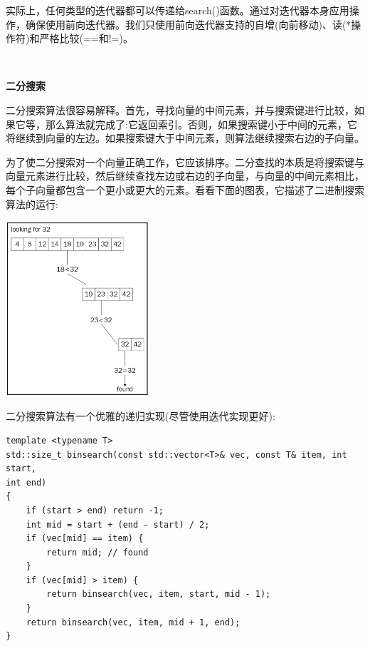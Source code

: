 实际上，任何类型的迭代器都可以传递给search()函数。通过对迭代器本身应用操作，确保使用前向迭代器。我们只使用前向迭代器支持的自增(向前移动)、读(*操作符)和严格比较(==和!=)。 \par

\noindent\textbf{}\ \par
\textbf{二分搜索} \ \par
二分搜索算法很容易解释。首先，寻找向量的中间元素，并与搜索键进行比较，如果它等，那么算法就完成了:它返回索引。否则，如果搜索键小于中间的元素，它将继续到向量的左边。如果搜索键大于中间元素，则算法继续搜索右边的子向量。 \par
为了使二分搜索对一个向量正确工作，它应该排序。二分查找的本质是将搜索键与向量元素进行比较，然后继续查找左边或右边的子向量，与向量的中间元素相比，每个子向量都包含一个更小或更大的元素。看看下面的图表，它描述了二进制搜索算法的运行: \par

\begin{center}
	\includegraphics[width=0.4\textwidth]{content/Section-2/Chapter-6/21}
\end{center}

二分搜索算法有一个优雅的递归实现(尽管使用迭代实现更好): \par

\begin{lstlisting}[caption={}]
template <typename T>
std::size_t binsearch(const std::vector<T>& vec, const T& item, int start,
int end)
{
	if (start > end) return -1;
	int mid = start + (end - start) / 2;
	if (vec[mid] == item) {
		return mid; // found
	}
	if (vec[mid] > item) {
		return binsearch(vec, item, start, mid - 1);
	}
	return binsearch(vec, item, mid + 1, end);
}
\end{lstlisting}

